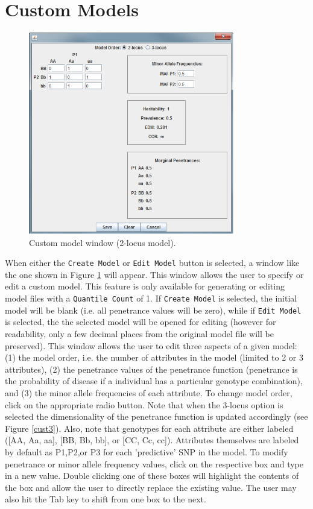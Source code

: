 \documentclass{report}
\begin{document}
\section{Custom Models}\label{custmod}
\begin{figure}[t]
\centering
\includegraphics[width=0.8\textwidth]{Figure4_UG.png}%
\caption{Custom model window (2-locus model).}
\label{cust2}
\end{figure}
When either the \texttt{Create Model} or \texttt{Edit Model} button is selected, a window like the one shown in Figure \ref{cust2} will appear.  This window allows the user to specify or edit a custom model.  This feature is only available for generating or editing model files with a \texttt{Quantile Count} of 1.  If \texttt{Create Model} is selected, the initial model will be blank (i.e. all penetrance values will be zero), while if \texttt{Edit Model} is selected, the the selected model will be opened for editing (however for readability, only a few decimal places from the original model file will be preserved).  This window allows the user to edit three aspects of a given model: (1) the model order, i.e. the number of attributes in the model (limited to 2 or 3 attributes), (2) the penetrance values of the penetrance function (penetrance is the probability of disease if a individual has a particular genotype combination), and (3) the minor allele frequencies of each attribute.  To change model order, click on the appropriate radio button.  Note that when the 3-locus option is selected the dimensionality of the penetrance function is updated accordingly (see Figure \ref{cust3}).  Also, note that genotypes for each attribute are either labeled ([AA, Aa, aa], [BB, Bb, bb], or [CC, Cc, cc]).  Attributes themselves are labeled by default as P1,P2,or P3 for each 'predictive' SNP in the model.  To modify penetrance or minor allele frequency values, click on the respective box and type in a new value.  Double clicking one of these boxes will highlight the contents of the box and allow the user to directly replace the existing value.  The user may also hit the Tab key to shift from one box to the next.  
\end{document}
